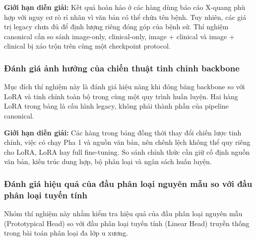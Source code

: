 \textbf{Giới hạn diễn giải:} Kết quả hoàn hảo ở các hàng dùng báo cáo X-quang
phù hợp với nguy cơ rò rỉ nhãn vì văn bản có thể chứa tên bệnh. Tuy nhiên, các
giá trị legacy chưa đủ để định lượng riêng đóng góp của bệnh sử. Thí nghiệm
canonical cần so sánh image-only, clinical-only, image + clinical và image +
clinical bị xáo trộn trên cùng một checkpoint protocol.

\subsubsection{Đánh giá ảnh hưởng của chiến thuật tinh chỉnh backbone}
Mục đích thí nghiệm này là đánh giá hiệu năng khi đóng băng backbone so với
LoRA và tinh chỉnh toàn bộ trong cùng một quy trình huấn luyện. Hai hàng LoRA
trong bảng là cấu hình legacy, không phải thành phần của pipeline canonical.

\begin{table}[htbp]
\centering
{}
\end{table}

\textbf{Giới hạn diễn giải:} Các hàng trong bảng đồng thời thay đổi chiến lược
tinh chỉnh, việc có chạy Pha 1 và nguồn văn bản, nên chênh lệch không thể quy
riêng cho LoRA, LoRA hay full fine-tuning. So sánh chính thức cần giữ cố định
nguồn văn bản, kiến trúc dung hợp, bộ phân loại và ngân sách huấn luyện.

\subsubsection{Đánh giá hiệu quả của đầu phân loại nguyên mẫu so với đầu phân loại tuyến tính}
Nhóm thí nghiệm này nhằm kiểm tra hiệu quả của đầu phân loại nguyên mẫu (Prototypical Head) so với đầu phân loại tuyến tính (Linear Head) truyền thống trong bài toán phân loại đa lớp u xương.

